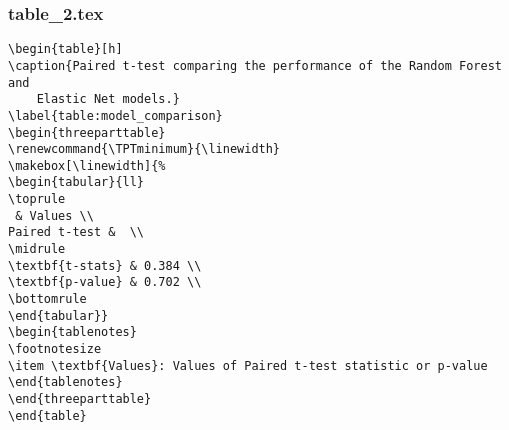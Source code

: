 \documentclass[11pt]{article}
\begin{document}
\subsubsection*{table\_2.tex}

\begin{Verbatim}[tabsize=4]
\begin{table}[h]
\caption{Paired t-test comparing the performance of the Random Forest and
	Elastic Net models.}
\label{table:model_comparison}
\begin{threeparttable}
\renewcommand{\TPTminimum}{\linewidth}
\makebox[\linewidth]{%
\begin{tabular}{ll}
\toprule
 & Values \\
Paired t-test &  \\
\midrule
\textbf{t-stats} & 0.384 \\
\textbf{p-value} & 0.702 \\
\bottomrule
\end{tabular}}
\begin{tablenotes}
\footnotesize
\item \textbf{Values}: Values of Paired t-test statistic or p-value
\end{tablenotes}
\end{threeparttable}
\end{table}

\end{Verbatim}
\end{document}

